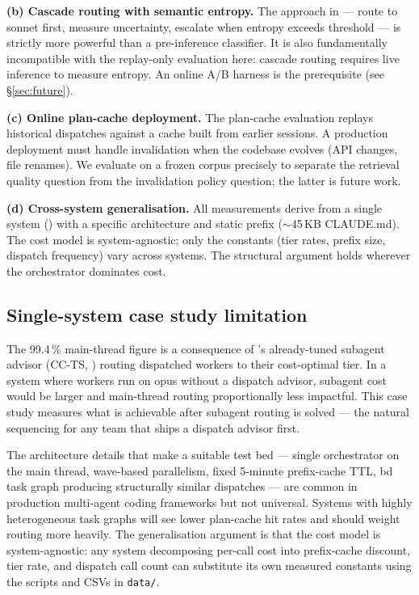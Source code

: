 \textbf{(b) Cascade routing with semantic entropy.} The approach in \cite{semanticentropy} --- route to sonnet first, measure uncertainty, escalate when entropy exceeds threshold --- is strictly more powerful than a pre-inference classifier. It is also fundamentally incompatible with the replay-only evaluation here: cascade routing requires live inference to measure entropy. An online A/B harness is the prerequisite (see §\ref{sec:future}).

\textbf{(c) Online plan-cache deployment.} The plan-cache evaluation replays historical dispatches against a cache built from earlier sessions. A production deployment must handle invalidation when the codebase evolves (API changes, file renames). We evaluate on a frozen corpus precisely to separate the retrieval quality question from the invalidation policy question; the latter is future work.

\textbf{(d) Cross-system generalisation.} All measurements derive from a single system (\blackrim) with a specific architecture and static prefix (\(\sim\)45\,KB CLAUDE.md). The cost model is system-agnostic; only the constants (tier rates, prefix size, dispatch frequency) vary across systems. The structural argument holds wherever the orchestrator dominates cost.

\subsection{Single-system case study limitation}

The 99.4\,\% main-thread figure is a consequence of \blackrim's already-tuned subagent advisor (CC-TS, \cite{moa1landscape}) routing dispatched workers to their cost-optimal tier. In a system where workers run on opus without a dispatch advisor, subagent cost would be larger and main-thread routing proportionally less impactful. This case study measures what is achievable after subagent routing is solved --- the natural sequencing for any team that ships a dispatch advisor first.

The architecture details that make \blackrim a suitable test bed --- single orchestrator on the main thread, wave-based parallelism, fixed 5-minute prefix-cache TTL, bd task graph producing structurally similar dispatches --- are common in production multi-agent coding frameworks but not universal. Systems with highly heterogeneous task graphs will see lower plan-cache hit rates and should weight routing more heavily. The generalisation argument is that the cost model is system-agnostic: any system decomposing per-call cost into prefix-cache discount, tier rate, and dispatch call count can substitute its own measured constants using the scripts and CSVs in \texttt{data/}.

